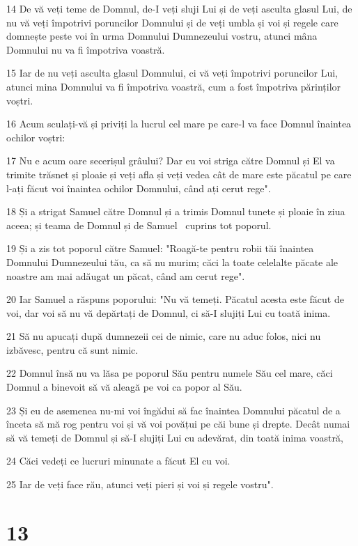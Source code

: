 \par 14 De vă veți teme de Domnul, de-I veți sluji Lui și de veți asculta glasul Lui, de nu vă veți împotrivi poruncilor Domnului și de veți umbla și voi și regele care domnește peste voi în urma Domnului Dumnezeului vostru, atunci mâna Domnului nu va fi împotriva voastră.
\par 15 Iar de nu veți asculta glasul Domnului, ci vă veți împotrivi poruncilor Lui, atunci mina Domnului va fi împotriva voastră, cum a fost împotriva părinților voștri.
\par 16 Acum sculați-vă și priviți la lucrul cel mare pe care-l va face Domnul înaintea ochilor voștri:
\par 17 Nu e acum oare secerișul grâului? Dar eu voi striga către Domnul și El va trimite trăsnet și ploaie și veți afla și veți vedea cât de mare este păcatul pe care l-ați făcut voi înaintea ochilor Domnului, când ați cerut rege".
\par 18 Și a strigat Samuel către Domnul și a trimis Domnul tunete și ploaie în ziua aceea; și teama de Domnul și de Samuel  cuprins tot poporul.
\par 19 Și a zis tot poporul către Samuel: "Roagă-te pentru robii tăi înaintea Domnului Dumnezeului tău, ca să nu murim; căci la toate celelalte păcate ale noastre am mai adăugat un păcat, când am cerut rege".
\par 20 Iar Samuel a răspuns poporului: "Nu vă temeți. Păcatul acesta este făcut de voi, dar voi să nu vă depărtați de Domnul, ci să-I slujiți Lui cu toată inima.
\par 21 Să nu apucați după dumnezeii cei de nimic, care nu aduc folos, nici nu izbăvesc, pentru că sunt nimic.
\par 22 Domnul însă nu va lăsa pe poporul Său pentru numele Său cel mare, căci Domnul a binevoit să vă aleagă pe voi ca popor al Său.
\par 23 Și eu de asemenea nu-mi voi îngădui să fac înaintea Domnului păcatul de a înceta să mă rog pentru voi și vă voi povățui pe căi bune și drepte. Decât numai să vă temeți de Domnul și să-I slujiți Lui cu adevărat, din toată inima voastră,
\par 24 Căci vedeți ce lucruri minunate a făcut El cu voi.
\par 25 Iar de veți face rău, atunci veți pieri și voi și regele vostru".

\chapter{13}

